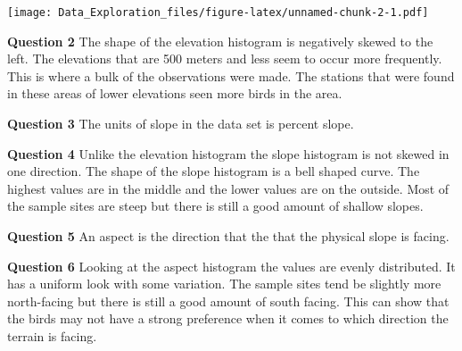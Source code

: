 \documentclass[
]{article}
\newenvironment{Shaded}{\begin{snugshade}}{\end{snugshade}}
\newcommand{\AttributeTok}[1]{\textcolor[rgb]{0.77,0.63,0.00}{#1}}
\newcommand{\DecValTok}[1]{\textcolor[rgb]{0.00,0.00,0.81}{#1}}
\newcommand{\FunctionTok}[1]{\textcolor[rgb]{0.00,0.00,0.00}{#1}}
\newcommand{\NormalTok}[1]{#1}
\newcommand{\SpecialCharTok}[1]{\textcolor[rgb]{0.00,0.00,0.00}{#1}}
\newcommand{\StringTok}[1]{\textcolor[rgb]{0.31,0.60,0.02}{#1}}
\begin{document}
\begin{Shaded}
\end{Shaded}

\texttt{[image: Data\_Exploration\_files/figure-latex/unnamed-chunk-2-1.pdf]}

\textbf{Question 2} The shape of the elevation histogram is negatively
skewed to the left. The elevations that are 500 meters and less seem to
occur more frequently. This is where a bulk of the observations were
made. The stations that were found in these areas of lower elevations
seen more birds in the area.

\textbf{Question 3} The units of slope in the data set is percent slope.

\textbf{Question 4} Unlike the elevation histogram the slope histogram
is not skewed in one direction. The shape of the slope histogram is a
bell shaped curve. The highest values are in the middle and the lower
values are on the outside. Most of the sample sites are steep but there
is still a good amount of shallow slopes.

\textbf{Question 5} An aspect is the direction that the that the
physical slope is facing.

\textbf{Question 6} Looking at the aspect histogram the values are
evenly distributed. It has a uniform look with some variation. The
sample sites tend be slightly more north-facing but there is still a
good amount of south facing. This can show that the birds may not have a
strong preference when it comes to which direction the terrain is
facing.
\end{document}
